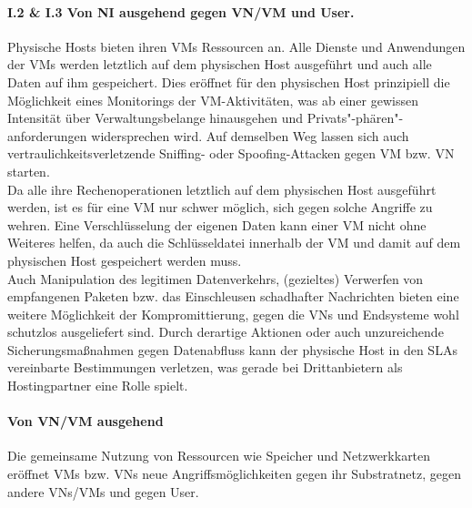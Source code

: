 \paragraph{I.2 \& I.3 Von NI ausgehend gegen VN/VM und User.}
\label{parag:vonNI}
Physische Hosts bieten ihren VMs Ressourcen an. Alle Dienste und Anwendungen der VMs werden letztlich auf dem physischen Host ausgeführt und auch alle Daten auf ihm gespeichert. Dies eröffnet für den physischen Host prinzipiell die Möglichkeit eines Monitorings der VM-Aktivitäten, was ab einer gewissen Intensität über Verwaltungsbelange hinausgehen und Privats"-phären"-anforderungen widersprechen wird. Auf demselben Weg lassen sich auch vertraulichkeitsverletzende Sniffing- oder Spoofing-Attacken gegen VM bzw. VN starten. \\
Da alle ihre Rechenoperationen letztlich auf dem physischen Host ausgeführt werden, ist es für eine VM nur schwer möglich, sich gegen solche Angriffe zu wehren. Eine Verschlüsselung der eigenen Daten kann einer VM nicht ohne Weiteres helfen, da auch die Schlüsseldatei innerhalb der VM und damit auf dem physischen Host gespeichert werden muss.\\
Auch Manipulation des legitimen Datenverkehrs, (gezieltes) Verwerfen von empfangenen Paketen bzw. das Einschleusen schadhafter Nachrichten bieten eine weitere Möglichkeit der Kompromittierung, gegen die VNs und Endsysteme wohl schutzlos ausgeliefert sind.
Durch derartige Aktionen oder auch unzureichende Sicherungsmaßnahmen gegen Datenabfluss kann der physische Host in den SLAs vereinbarte Bestimmungen verletzen, was gerade bei Drittanbietern als Hostingpartner eine Rolle spielt.




\paragraph{Von VN/VM ausgehend}
\label{parag:vonVN}
Die gemeinsame Nutzung von Ressourcen wie Speicher und Netzwerkkarten eröffnet VMs bzw. VNs neue Angriffsmöglichkeiten gegen ihr Substratnetz, gegen andere VNs/VMs und gegen User.


